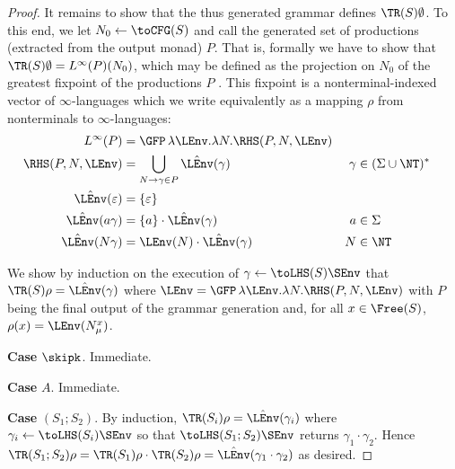 \begin{proof}
  It remains to show that the thus generated grammar defines $\TR (S)\emptyset$. To this end, we let
  $N_0 \gets \toCFG (S)$ and call the generated set of productions (extracted from the output monad)
  $P$. That is, formally we have to show that $\TR (S) \emptyset = L^\infty (P)( N_0)$, which may be
  defined as the projection on $N_0$ of the greatest fixpoint of the productions $P$
  \cite{Niwinski1984}. This fixpoint is a nonterminal-indexed vector of $\infty$-languages which we
  write equivalently as a mapping $\rho$ from nonterminals to $\infty$-languages:
  \begin{align*}
    L^\infty (P) & = \GFP\, \lambda \LEnv. \lambda N. \RHS (P, N, \LEnv) \\
    \RHS (P, N, \LEnv) &= \bigcup_{N \to \gamma \in P} \hat\LEnv({\gamma}) & \gamma & \in (\Sigma \cup
                                                                                 \NT)^* \\
    \hat\LEnv (\varepsilon) &= \{\varepsilon\} \\
    \hat\LEnv (a \gamma)  &= \{ a \} \cdot \hat\LEnv (\gamma)  & a &\in \Sigma\\
    \hat\LEnv (N \gamma) &= \LEnv (N) \cdot \hat\LEnv (\gamma) & N & \in \NT
  \end{align*}

  We show by induction on the execution of $\gamma \gets \toLHS(S)\SEnv$ that $\TR (S) \rho =
  \hat\LEnv (\gamma) $ where $\LEnv = \GFP\, \lambda \LEnv. \lambda N. \RHS (P, N, \LEnv)$ with $P$
  being the final output of the grammar generation and, for all $x\in\Free (S)$, $\rho (x) = \LEnv (N_\mu^x)$.

  \textbf{Case }$\skipk$. Immediate.

  \textbf{Case }$A$. Immediate.

  \textbf{Case }$(S_1;S_2)$. By induction, $\TR (S_i) \rho = \hat\LEnv (\gamma_i)$ where $\gamma_i
  \gets \toLHS (S_i)\SEnv$ so that $\toLHS (S_1;S_2)\SEnv$
  returns $\gamma_1\cdot\gamma_2$. Hence $\TR (S_1;S_2)\rho = \TR (S_1)\rho \cdot \TR (S_2)\rho =
  \hat\LEnv (\gamma_1\cdot\gamma_2)$ as desired.


\end{proof}
